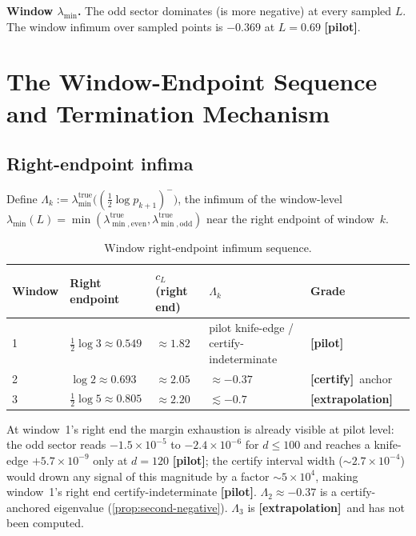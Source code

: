 \documentclass[12pt,a4paper]{amsart}
\theoremstyle{plain}
\theoremstyle{definition}
\newcommand{\lmin}{\lambda_{\min}}
\newcommand{\ltrue}{\lambda_{\min}^{\mathrm{true}}}
\newcommand{\ltrues}[1]{\lambda_{\min,\mathrm{#1}}^{\mathrm{true}}}
\newcommand{\cL}{c_L}
\newcommand{\certify}{\textbf{[certify]}}
\newcommand{\pilot}{\textbf{[pilot]}}
\newcommand{\extrap}{\textbf{[extrapolation]}}
\begin{document}
\textbf{Window $\lmin$.}  The odd sector dominates (is more negative) at
every sampled $L$.  The window infimum over sampled points is $-0.369$ at
$L=0.69$ \pilot.

\section{The Window-Endpoint Sequence and Termination Mechanism}
\label{sec:trend}

\subsection{Right-endpoint infima}

Define $\Lambda_k := \ltrue\!\bigl((\tfrac12\log p_{k+1})^-\bigr)$, the
infimum of the window-level $\lambda_{\min}(L) = \min(\ltrues{even},
\ltrues{odd})$ near the right endpoint of window~$k$.

\begin{table}[h]
\centering
\caption{Window right-endpoint infimum sequence.}
\label{tab:sequence}
\begin{tabular}{@{}llllll@{}}
\toprule
Window & Right endpoint & $\cL$ (right end) & $\Lambda_k$ & Grade \\
\midrule
1 & $\tfrac12\log 3 \approx 0.549$ & $\approx 1.82$ &
  pilot knife-edge / certify-indeterminate & \pilot \\
2 & $\log 2 \approx 0.693$ & $\approx 2.05$ &
  $\approx -0.37$ & \certify~anchor \\
3 & $\tfrac12\log 5 \approx 0.805$ & $\approx 2.20$ &
  $\lesssim -0.7$ & \extrap \\
\bottomrule
\end{tabular}
\end{table}

At window~1's right end the margin exhaustion is already visible at pilot level:
the odd sector reads $-1.5\times10^{-5}$ to $-2.4\times10^{-6}$ for $d \le 100$
and reaches a knife-edge $+5.7\times10^{-9}$ only at $d=120$ \pilot; the certify
interval width ($\sim 2.7\times10^{-4}$) would drown any signal of this magnitude
by a factor $\sim 5\times10^4$, making window~1's right end certify-indeterminate
\pilot.  $\Lambda_2 \approx -0.37$ is a certify-anchored eigenvalue
(\cref{prop:second-negative}).  $\Lambda_3$ is \extrap\ and has not been
computed.
\end{document}
